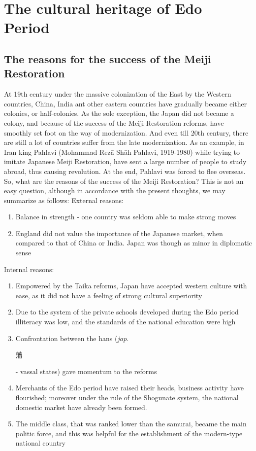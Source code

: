 \documentclass[11pt]{book}
\begin{document}
\chapter{The cultural heritage of Edo Period}
\section{The reasons for the success of the Meiji Restoration}
At 19th century under the massive colonization of the East by the Western countries, China, India ant other eastern countries have gradually became
either colonies, or half-colonies. As the sole exception, the Japan did not became a colony, and because of the success of the Meiji Restoration
reforms, have smoothly set foot on the way of modernization. And even till 20th century, there are still a lot of countries suffer from the late
modernization. As an example, in Iran king Pahlavi (Mohammad Rez\={a} Sh\={a}h Pahlavi, 1919-1980)
while trying to imitate Japanese Meiji Restoration, have sent a large number of people
to study abroad, thus causing revolution. At the end, Pahlavi was forced to flee overseas.\\
So, what are the reasons of the success of the Meiji Restoration? This is not an easy question, although in accordance with the present thoughts,
we may summarize as follows:
External reasons:
\begin{enumerate}
	\item{Balance in strength - one country was seldom able to make strong moves}
	\item{England did not value the importance of the Japanese market, when compared to that of China or India. Japan was though as minor
		in diplomatic sense}
\end{enumerate}
Internal reasons:
\begin{enumerate}
	\item{Empowered by the Taika reforms, Japan have accepted western culture with ease, as it did not have a feeling of strong cultural
		superiority}
	\item{Due to the system of the private schools developed during the Edo period illiteracy was low, and the standards of the national
		education were high}
	\item{Confrontation between the hans (\textit{jap.} \begin{CJK}{UTF8}{bsmi}藩\end{CJK} - vassal states) gave momentum to the reforms}
	\item{Merchants of the Edo period have raised their heads, business activity have flourished; moreover under the rule of the Shogunate
		system, the national domestic market have already been formed.}
	\item{The middle class, that was ranked lower than the samurai, became the main politic force, and this was helpful for the establishment
		of the modern-type national country}
\end{enumerate}
\end{document}
